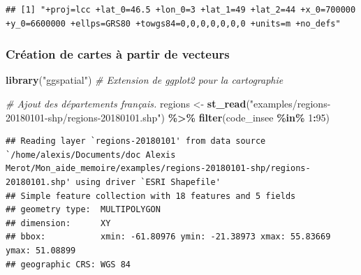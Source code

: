 \documentclass[
  french,
]{book}
\newenvironment{Shaded}{\begin{snugshade}}{\end{snugshade}}
\newcommand{\CommentTok}[1]{\textcolor[rgb]{0.56,0.35,0.01}{\textit{#1}}}
\newcommand{\DecValTok}[1]{\textcolor[rgb]{0.00,0.00,0.81}{#1}}
\newcommand{\KeywordTok}[1]{\textcolor[rgb]{0.13,0.29,0.53}{\textbf{#1}}}
\newcommand{\NormalTok}[1]{#1}
\newcommand{\OperatorTok}[1]{\textcolor[rgb]{0.81,0.36,0.00}{\textbf{#1}}}
\newcommand{\StringTok}[1]{\textcolor[rgb]{0.31,0.60,0.02}{#1}}
\begin{document}
\begin{Shaded}
\end{Shaded}

\begin{verbatim}
## [1] "+proj=lcc +lat_0=46.5 +lon_0=3 +lat_1=49 +lat_2=44 +x_0=700000 +y_0=6600000 +ellps=GRS80 +towgs84=0,0,0,0,0,0,0 +units=m +no_defs"
\end{verbatim}

\hypertarget{cruxe9ation-de-cartes-uxe0-partir-de-vecteurs}{%
\subsubsection{Création de cartes à partir de vecteurs}\label{cruxe9ation-de-cartes-uxe0-partir-de-vecteurs}}



\begin{Shaded}
\begin{Highlighting}[]
\KeywordTok{library}\NormalTok{(}\StringTok{"ggspatial"}\NormalTok{) }\CommentTok{\# Extension de ggplot2 pour la cartographie}

\CommentTok{\# Ajout des départements français.}
\NormalTok{regions \textless{}{-}}\StringTok{ }\KeywordTok{st\_read}\NormalTok{(}\StringTok{"examples/regions{-}20180101{-}shp/regions{-}20180101.shp"}\NormalTok{) }\OperatorTok{\%\textgreater{}\%}
\StringTok{  }\KeywordTok{filter}\NormalTok{(code\_insee }\OperatorTok{\%in\%}\StringTok{ }\DecValTok{1}\OperatorTok{:}\DecValTok{95}\NormalTok{)}
\end{Highlighting}
\end{Shaded}

\begin{verbatim}
## Reading layer `regions-20180101' from data source `/home/alexis/Documents/doc Alexis Merot/Mon_aide_memoire/examples/regions-20180101-shp/regions-20180101.shp' using driver `ESRI Shapefile'
## Simple feature collection with 18 features and 5 fields
## geometry type:  MULTIPOLYGON
## dimension:      XY
## bbox:           xmin: -61.80976 ymin: -21.38973 xmax: 55.83669 ymax: 51.08899
## geographic CRS: WGS 84
\end{verbatim}
\end{document}
